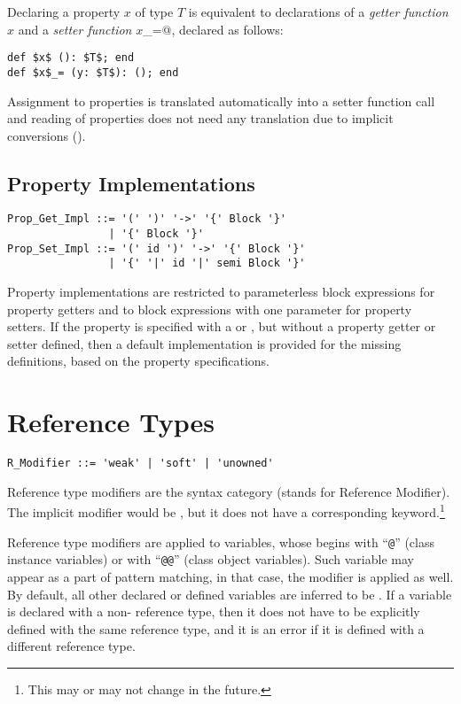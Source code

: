 Declaring a property $x$ of type $T$ is equivalent to declarations of a {\em getter function} $x$ and a {\em setter function} \lstinline@$x$_=@, declared as follows:

\begin{lstlisting}
def $x$ (): $T$; end
def $x$_= (y: $T$): (); end
\end{lstlisting}

Assignment to properties is translated automatically into a setter function call and reading of properties does not need any translation due to implicit conversions (). 






\subsection{Property Implementations}
\label{sec:property-impl}

\begin{lstlisting}
Prop_Get_Impl ::= '(' ')' '->' '{' Block '}'
                | '{' Block '}'
Prop_Set_Impl ::= '(' id ')' '->' '{' Block '}'
                | '{' '|' id '|' semi Block '}'
\end{lstlisting}

Property implementations are restricted to parameterless block expressions for property getters and to block expressions with one parameter for property setters. If the property is specified with a  or , but without a property getter or setter defined, then a default implementation is provided for the missing definitions, based on the property specifications. 





\section{Reference Types}
\label{sec:ref-types}

\syntax\begin{lstlisting}
R_Modifier ::= 'weak' | 'soft' | 'unowned'
\end{lstlisting}

Reference type modifiers are the syntax category  (stands for Reference Modifier). The implicit modifier would be , but it does not have a corresponding keyword.\footnote{This may or may not change in the future.} 

Reference type modifiers are applied to variables, whose  begins with ``\lstinline!@!'' (class instance variables) or with ``\lstinline!@@!'' (class object variables). Such variable may appear as a part of pattern matching, in that case, the modifier is applied as well. By default, all other declared or defined variables are inferred to be . If a variable is declared with a non- reference type, then it does not have to be explicitly defined with the same reference type, and it is an error if it is defined with a different reference type. 

